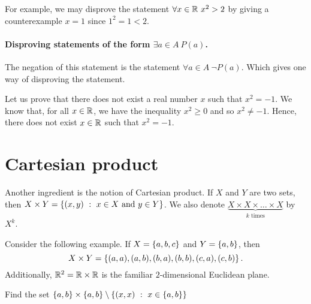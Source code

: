 For example, we may disprove the statement $\forall x \in \mathbb{R} \ x^2 > 2$ by
giving a counterexample $x = 1$ since $1^2 = 1 < 2$.

\paragraph{Disproving statements of the form $\exists a \in A \ P(a)$.}
The negation of this statement is the statement $\forall a \in A \ \lnot P(a)$.
Which gives one way of disproving the statement.

Let us prove that there does not exist a real number $x$ such that $x^2 = -1$.
We know that, for all $x \in \mathbb{R}$, we have the inequality $x^2 \ge 0$ and so $x^2
\neq -1$. Hence, there does not exist $x \in \mathbb{R}$ such that $x^2 = -1$.

\section{Cartesian product}
Another ingredient is the notion of Cartesian product. If $X$ and $Y$ are two
sets, then $X \times Y = \set[x \in X \text{ and } y \in Y]{(x, y)}$. We also
denote $\underbrace{X \times X \times \dots \times X}_{k \text{ times}}$ by
$X^k$.

Consider the following example. If $X = \set{a, b, c}$ and $Y = \set{a, b}$,
then
\[
    X \times Y = \set{(a, a), (a, b), (b, a), (b, b), (c, a), (c, b)}.
\]
Additionally, $\mathbb{R}^2 = \mathbb{R} \times \mathbb{R}$ is the familiar $2$-dimensional Euclidean
plane.

\begin{exercise}
    Find the set $\set{a, b} \times \set{a, b} \setminus
        \set[x \in \set{a, b}]{(x, x)}$
\end{exercise}

